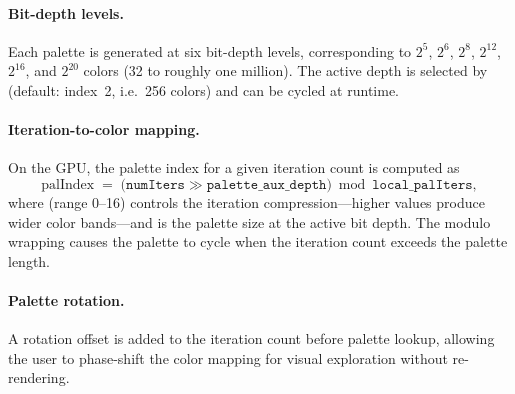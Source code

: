 \paragraph{Bit-depth levels.}
Each palette is generated at six bit-depth levels, corresponding to
$2^5$, $2^6$, $2^8$, $2^{12}$, $2^{16}$, and $2^{20}$ colors
(32 to roughly one million).  The active depth is selected by
 (default: index~2, i.e.\ 256 colors)
and can be cycled at runtime.

\paragraph{Iteration-to-color mapping.}
On the GPU, the palette index for a given iteration count is computed
as
\[
  \mathrm{palIndex} \;=\;
  \bigl(\mathtt{numIters} \gg \mathtt{palette\_aux\_depth}\bigr)
    \bmod \mathtt{local\_palIters},
\]
where  (range 0--16) controls the iteration
compression---higher values produce wider color bands---and
 is the palette size at the active bit depth.
The modulo wrapping causes the palette to cycle when the iteration
count exceeds the palette length.

\paragraph{Palette rotation.}
A rotation offset  is added to the iteration
count before palette lookup, allowing the user to phase-shift the
color mapping for visual exploration without re-rendering.

